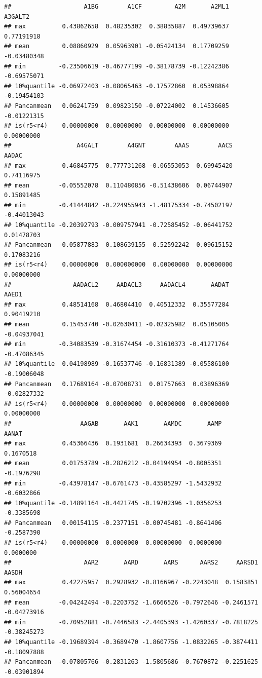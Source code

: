\documentclass[
]{article}
\begin{document}
\begin{verbatim}
##                    A1BG        A1CF         A2M       A2ML1     A3GALT2
## max          0.43862658  0.48235302  0.38835887  0.49739637  0.77191918
## mean         0.08860929  0.05963901 -0.05424134  0.17709259 -0.03480348
## min         -0.23506619 -0.46777199 -0.38178739 -0.12242386 -0.69575071
## 10%quantile -0.06972403 -0.08065463 -0.17572860  0.05398864 -0.19454103
## Pancanmean   0.06241759  0.09823150 -0.07224002  0.14536605 -0.01221315
## is(r5<r4)    0.00000000  0.00000000  0.00000000  0.00000000  0.00000000
##                  A4GALT        A4GNT        AAAS        AACS       AADAC
## max          0.46845775  0.777731268 -0.06553053  0.69945420  0.74116975
## mean        -0.05552078  0.110480856 -0.51438606  0.06744907  0.15891485
## min         -0.41444842 -0.224955943 -1.48175334 -0.74502197 -0.44013043
## 10%quantile -0.20392793 -0.009757941 -0.72585452 -0.06441752  0.01478703
## Pancanmean  -0.05877883  0.108639155 -0.52592242  0.09615152  0.17083216
## is(r5<r4)    0.00000000  0.000000000  0.00000000  0.00000000  0.00000000
##                 AADACL2     AADACL3     AADACL4       AADAT       AAED1
## max          0.48514168  0.46804410  0.40512332  0.35577284  0.90419210
## mean         0.15453740 -0.02630411 -0.02325982  0.05105005 -0.04937041
## min         -0.34083539 -0.31674454 -0.31610373 -0.41271764 -0.47086345
## 10%quantile  0.04198989 -0.16537746 -0.16831389 -0.05586100 -0.19006048
## Pancanmean   0.17689164 -0.07008731  0.01757663  0.03896369 -0.02827332
## is(r5<r4)    0.00000000  0.00000000  0.00000000  0.00000000  0.00000000
##                   AAGAB       AAK1       AAMDC       AAMP      AANAT
## max          0.45366436  0.1931681  0.26634393  0.3679369  0.1670518
## mean         0.01753789 -0.2826212 -0.04194954 -0.8005351 -0.1976298
## min         -0.43978147 -0.6761473 -0.43585297 -1.5432932 -0.6032866
## 10%quantile -0.14891164 -0.4421745 -0.19702396 -1.0356253 -0.3385698
## Pancanmean   0.00154115 -0.2377151 -0.00745481 -0.8641406 -0.2587390
## is(r5<r4)    0.00000000  0.0000000  0.00000000  0.0000000  0.0000000
##                    AAR2       AARD       AARS      AARS2     AARSD1       AASDH
## max          0.42275957  0.2928932 -0.8166967 -0.2243048  0.1583851  0.56004654
## mean        -0.04242494 -0.2203752 -1.6666526 -0.7972646 -0.2461571 -0.04273916
## min         -0.70952881 -0.7446583 -2.4405393 -1.4260337 -0.7818225 -0.38245273
## 10%quantile -0.19689394 -0.3689470 -1.8607756 -1.0832265 -0.3874411 -0.18097888
## Pancanmean  -0.07805766 -0.2831263 -1.5805686 -0.7670872 -0.2251625 -0.03901894

\end{verbatim}
\end{document}
